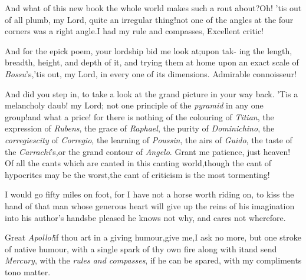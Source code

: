 \documentclass{article}
\begin{document}
And what of this new book the whole world makes such a rout
about?\tsk Oh! ’tis out of all plumb, my Lord,\tsh\break
quite an irregular thing!\tsk not one of
the angles at the four corners was a right angle.\tsk I had my rule
and compasses,
\break
Excellent critic!

\tsh And for the epick poem, your\break
lordship bid me look at;\tsk upon tak-\break
ing the length, breadth, height, and\break
depth of it, and trying them at home\break
upon an exact scale of \textit{Bossu}’s,\tsh ’tis out,\break
my Lord, in every one of its dimensions.\break
\tsh Admirable connoisseur!

\tsh And did you step in, to take a look at the grand
picture in your way back.\tsk\break
\tsh ’Tis a melancholy daub! my Lord;\break
not one principle of the \textit{pyramid} in any one
group!\tsh and what a price!\tsh\break
for there is nothing of
the colouring of \textit{Titian},\tsk
the expression of \textit{Rubens},\tsk
the grace of \textit{Raphael},\tsk
the purity of 
\textit{Dominichino},\tsk
the \textit{corregiescity} of \textit{Corregio},\tsk
the learning of \textit{Poussin},\tsk
the airs of \textit{Guido},\tsk
the taste of the \textit{Carrachi}’s,\tsk\break or
the grand contour of \textit{Angelo}.\tsh\break
Grant me patience, just heaven!\tsh\break
Of all the cants which are canted in this canting world,\tsk though the cant of
hypocrites may be the worst,\tsh the cant of criticism is the most tormenting!

I would go fifty miles on foot, for I have not a horse worth
riding on, to kiss the hand of that man whose generous heart will
give up the reins of his imagination into his author’s
hands\tsh be pleased he knows not why, and cares not
wherefore.

Great \textit{Apollo!}\@ if thou art in a giving humour,\tsk give
me,\tsk I ask no more, but one stroke of native humour,
with
a single spark of thy own fire along with it\tsh and send
\textit{Mercury}, with the \textit{rules and compasses}, if he can be
spared, with my compliments to\tsh no matter.
\end{document}
